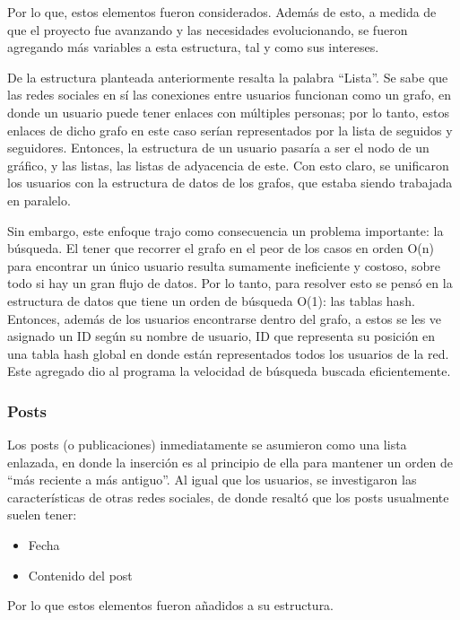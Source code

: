 \documentclass[9pt,letterpaper,onecolumn]{rho-class/rho}
\begin{document}
Por lo que, estos elementos fueron considerados. Además de esto, a medida de que el proyecto fue avanzando y las necesidades evolucionando, se fueron agregando más variables a esta estructura, tal y como sus intereses.

\vspace{0.5cm}

De la estructura planteada anteriormente resalta la palabra “Lista”. Se sabe que las redes sociales en sí las conexiones entre usuarios funcionan como un grafo, en donde un usuario puede tener enlaces con múltiples personas; por lo tanto, estos enlaces de dicho grafo en este caso serían representados por la lista de seguidos y seguidores. Entonces, la estructura de un usuario pasaría a ser el nodo de un gráfico, y las listas, las listas de adyacencia de este. Con esto claro, se unificaron los usuarios con la estructura de datos de los grafos, que estaba siendo trabajada en paralelo. 

\vspace{0.5cm}

Sin embargo, este enfoque trajo como consecuencia un problema importante: la búsqueda. El tener que recorrer el grafo en el peor de los casos en orden O(n) para encontrar un único usuario resulta sumamente ineficiente y costoso, sobre todo si hay un gran flujo de datos. Por lo tanto, para resolver esto se pensó en la estructura de datos que tiene un orden de búsqueda O(1): las tablas hash. Entonces, además de los usuarios encontrarse dentro del grafo, a estos se les ve asignado un ID según su nombre de usuario, ID que representa su posición en una tabla hash global en donde están representados todos los usuarios de la red. Este agregado dio al programa la velocidad de búsqueda buscada eficientemente.

\subsubsection{Posts}
Los posts (o publicaciones) inmediatamente se asumieron como una lista enlazada, en donde la inserción es al principio de ella para mantener un orden de “más reciente a más antiguo”. Al igual que los usuarios, se investigaron las características de otras redes sociales, de donde resaltó que los posts usualmente suelen tener:
\begin{itemize}
	\item Fecha
	\item Contenido del post
\end{itemize}
	Por lo que estos elementos fueron añadidos a su estructura.
\end{document}

